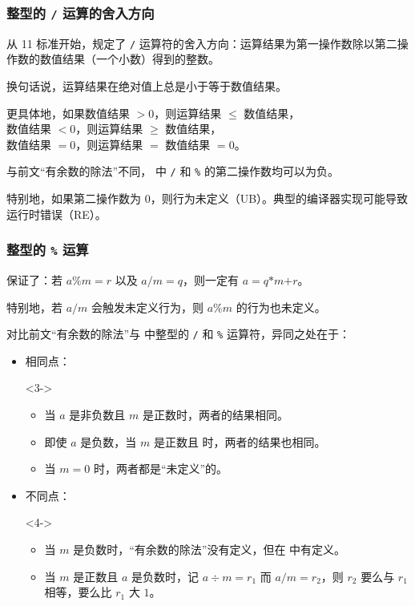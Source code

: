 \begin{frame}
  \frametitle{整型的 \texttt{/} 运算的舍入方向}
  从 \Cpp{}11 标准开始，规定了 \texttt{/} 运算符的舍入方向：运算结果为第一操作数除以第二操作数的数值结果（一个小数）得到的整数。
  \pause
  
  \emptyline
  换句话说，运算结果\alert{在绝对值上}总是小于等于数值结果。
  
  更具体地，如果数值结果 $> 0$，则运算结果 $\le$ 数值结果，\\
  \-\hspace{7em}数值结果 $< 0$，则运算结果 $\ge$ 数值结果，\\
  \-\hspace{7em}数值结果 $= 0$，则运算结果 $=$ 数值结果 $= 0$。
  \pause
  
  \emptyline
  与前文“有余数的除法”不同，\Cpp{} 中 \texttt{/} 和 \texttt{\%} 的\alert{第二操作数均可以为负}。
  \pause
  
  \emptyline
  特别地，如果第二操作数为 $0$，则行为未定义（UB）。典型的编译器实现可能导致运行时错误（RE）。
\end{frame}
\begin{frame}
  \frametitle{整型的 \texttt{\%} 运算}
  \Cpp{} 保证了：若 $a \mathbin{\texttt{\%}} m = r$ 以及 $a \mathbin{\texttt{/}} m = q$，则一定有 $a = q \mathbin{\texttt{*}} m \mathbin{\texttt{+}} r$。
  
  特别地，若 $a \mathbin{\texttt{/}} m$ 会触发未定义行为，则 $a \mathbin{\texttt{\%}} m$ 的行为也未定义。
  \pause
  
  \emptyline
  对比前文“有余数的除法”与 \Cpp{} 中整型的 \texttt{/} 和 \texttt{\%} 运算符，异同之处在于：
  \begin{itemize}
    \item 相同点：
    \begin{visibleenv}<3->
      \begin{itemize}
        \item 当 $a$ 是非负数且 $m$ 是正数时，两者的结果相同。
        \item 即使 $a$ 是负数，当 $m$ 是正数且 时，两者的结果也相同。
        \item 当 $m = 0$ 时，两者都是“未定义”的。
      \end{itemize}
    \end{visibleenv}
    \item 不同点：
    \begin{visibleenv}<4->
      \begin{itemize}
        \item 当 $m$ 是负数时，“有余数的除法”没有定义，但在 \Cpp{} 中有定义。
        \item 当 $m$ 是正数且 $a$ 是负数时，记 $a \div m = r_1$ 而 $a \mathbin{\texttt{/}} m = r_2$，则 $r_2$ 要么与 $r_1$ 相等，要么比 $r_1$ 大 $1$。
      \end{itemize}
    \end{visibleenv}
  \end{itemize}
\end{frame}
